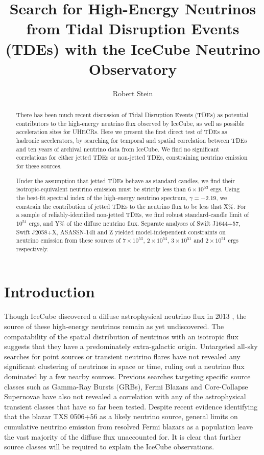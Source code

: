 \documentclass[twocolumn, tighten, linenumbers]{aastex62}
\begin{document}
\title{Search for High-Energy Neutrinos from Tidal Disruption Events (TDEs) with the IceCube Neutrino Observatory}

\author{Robert Stein}

\begin{abstract}
There has been much recent discussion of Tidal Disruption Events (TDEs) as potential contributors to the high-energy neutrino flux observed by IceCube, as well as possible acceleration sites for UHECRs. Here we present the first direct test of TDEs as hadronic accelerators, by searching for temporal and spatial correlation between TDEs and ten years of archival neutrino data from IceCube. We find no significant correlations for either jetted TDEs or non-jetted TDEs, constraining neutrino emission for these sources. 

Under the assumption that jetted TDEs behave as standard candles, we find their isotropic-equivalent neutrino emission must be strictly less than $6 \times 10^{53} $ ergs.  Using the best-fit spectral index of the high-energy neutrino spectrum, $\gamma=-2.19$, we constrain the contribution of jetted TDEs to the neutrino flux to be less that X\%.  For a sample of reliably-identified non-jetted TDEs, we find robust standard-candle limit of $10^{51} $ ergs, and Y\% of the diffuse neutrino flux. Separate analyses of Swift J1644+57, Swift J2058+X, ASASSN-14li and Z yielded model-independent constraints on neutrino emission from these sources of $7 \times 10^{53} $, $2 \times 10^{54} $,  $3 \times 10^{51} $ and $2 \times 10^{51} $ ergs respectively.
\end{abstract}


\section{Introduction} 
\label{sec:introduction}

Though IceCube discovered a diffuse astrophysical neutrino flux in 2013 \citep{Aartsen:2015knd, Aartsen:2013jdh}, the source of these high-energy neutrinos remain as yet undiscovered. The compatability of the spatial distribution of neutrinos with an isotropic flux suggests that they have a predominately extra-galactic origin. Untargeted all-sky searches for point sources or transient neutrino flares have not revealed any significant clustering of neutrinos in space or time, ruling out a neutrino flux dominated by a few nearby sources. Previous searches targeting specific source classes such as Gamma-Ray Bursts (GRBs), Fermi Blazars and Core-Collapse Supernovae have also not revealed a correlation with any of the astrophysical transient classes that have so far been tested. Despite recent evidence identifying that the blazar TXS 0506+56 as a likely neutrino source, general limits on cumulative neutrino emission from resolved Fermi blazars as a population leave the vast majority of the diffuse flux unaccounted for. It is clear that further source classes will be required to explain the IceCube observations.
\end{document}

